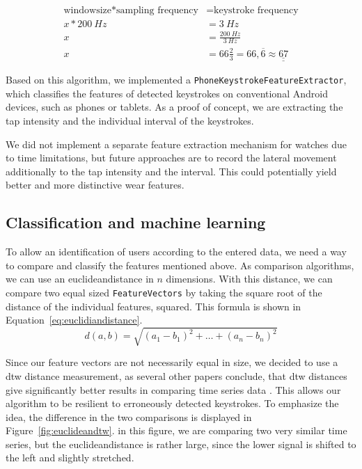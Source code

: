 \begin{equation}\label{eq:windowsize}\begin{split}
\textrm{windowsize} * \textrm{sampling frequency} & = \textrm{keystroke frequency}\\
x * \SI{200}{Hz} & = \SI{3}{Hz}\\
x & = \frac{\SI{200}{Hz}}{\SI{3}{Hz}}\\
x & = 66 \frac{2}{3} = 66,\overline{6} \approx \underline{\underline{67}}
\end{split}\end{equation}

Based on this algorithm, we implemented a \lstinline$PhoneKeystrokeFeatureExtractor$,
which classifies the features of detected keystrokes on conventional Android devices, such as phones or tablets. As a proof of concept, we are extracting the tap intensity and the individual interval of the keystrokes.
    
We did not implement a separate feature extraction mechanism for watches due to time limitations, but future approaches are to record the lateral movement additionally to the tap intensity and the interval. This could potentially yield better and more distinctive wear features.

\subsection{Classification and machine learning}
To allow an identification of users according to the entered data, we need a way to compare and classify the features mentioned above. 
As comparison algorithms, we can use an \gls{euclideandistance} in $n$ dimensions. With this distance, we can compare two equal sized \lstinline$FeatureVectors$ by taking the square root of the distance of the individual features, squared. This formula is shown in Equation~\ref{eq:euclidiandistance}.
\begin{equation}\label{eq:euclidiandistance}
d(a, b) = \sqrt{(a_1 - b_1)^2 + \ldots + (a_n - b_n)^2}
\end{equation}

Since our feature vectors are not necessarily equal in size, we decided to use a \gls{dtw} distance measurement, as several other papers conclude, that \gls{dtw} distances give significantly better results in comparing time series data \cite{ding2008querying}. This allows our algorithm to be resilient to erroneously detected keystrokes. To emphasize the idea, the difference in the two comparisons is displayed in Figure~\ref{fig:euclideandtw}. in this figure, we are comparing two very similar time series, but the \gls{euclideandistance} is rather large, since the lower signal is shifted to the left and slightly stretched.


